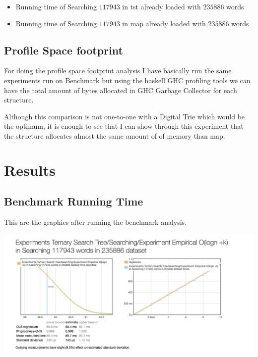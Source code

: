\documentclass[12pt, a4paper]{article}
\begin{document}
\begin{itemize}
  \item Running time of Searching $117943$ in \acrshort{tst} already loaded with $235886$ words
  \item Running time of Searching $117943$ in \acrshort{map} already loaded with $235886$ words
\end{itemize}

\subsection{Profile Space footprint}
For doing the profile space footprint analysis I have basically run the same experiments run on Benchmark but using the \acrshort{haskell} GHC profiling tools we can have the total amount of bytes allocated in GHC Garbage Collector for each structure.

Although this comparison is not one-to-one with a Digital Trie which would be the optimum, it is enough to see that I can show through this experiment that the structure allocates almost the same amount of of memory than \acrshort{map}.

\section{Results}
\subsection{Benchmark Running Time}
This are the graphics after running the benchmark analysis.

\begin{minipage}[t]{\linewidth}
  \includegraphics[width=\textwidth]{tst_bench}
  \captionsetup{type=figure}
  \label{fig:tst_bench}
\end{minipage}
\end{document}
